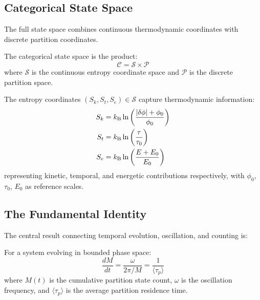 \subsection{Categorical State Space}

The full state space combines continuous thermodynamic coordinates with discrete partition coordinates.

\begin{definition}
\label{def:statespace}
The categorical state space is the product:
\begin{equation}
    \mathcal{C} = \mathcal{S} \times \mathcal{P}
\end{equation}
where $\mathcal{S}$ is the continuous entropy coordinate space and $\mathcal{P}$ is the discrete partition space.
\end{definition}

The entropy coordinates $(S_k, S_t, S_e) \in \mathcal{S}$ capture thermodynamic information:
\begin{align}
    S_k &= k_{\mathrm{B}} \ln\left(\frac{|\delta\phi| + \phi_0}{\phi_0}\right) \\
    S_t &= k_{\mathrm{B}} \ln\left(\frac{\tau}{\tau_0}\right) \\
    S_e &= k_{\mathrm{B}} \ln\left(\frac{E + E_0}{E_0}\right)
\end{align}
representing kinetic, temporal, and energetic contributions respectively, with $\phi_0$, $\tau_0$, $E_0$ as reference scales.

\subsection{The Fundamental Identity}

The central result connecting temporal evolution, oscillation, and counting is:

\begin{theorem}
\label{thm:fundamental}
For a system evolving in bounded phase space:
\begin{equation}
    \frac{dM}{dt} = \frac{\omega}{2\pi/M} = \frac{1}{\langle\tau_p\rangle}
\end{equation}
where $M(t)$ is the cumulative partition state count, $\omega$ is the oscillation frequency, and $\langle\tau_p\rangle$ is the average partition residence time.
\end{theorem}

